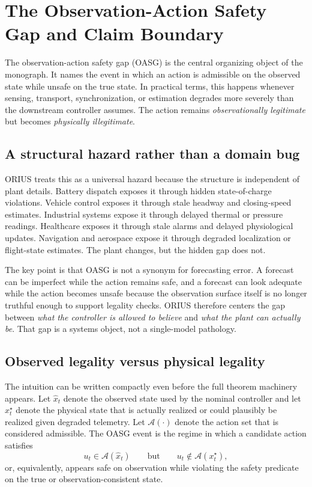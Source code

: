 \chapter{The Observation-Action Safety Gap and Claim Boundary}
\label{ch:oasg-claim-boundary}
\label{ch:safety-illusion}

The observation-action safety gap (OASG) is the central organizing object of the
monograph.  It names the event in which an action is admissible on the observed state
while unsafe on the true state.  In practical terms, this happens whenever sensing,
transport, synchronization, or estimation degrades more severely than the downstream
controller assumes.  The action remains \emph{observationally legitimate} but becomes
\emph{physically illegitimate}.

\section{A structural hazard rather than a domain bug}
ORIUS treats this as a universal hazard because the structure is independent of plant
details.  Battery dispatch exposes it through hidden state-of-charge violations.  Vehicle
control exposes it through stale headway and closing-speed estimates.  Industrial systems
expose it through delayed thermal or pressure readings.  Healthcare exposes it through
stale alarms and delayed physiological updates.  Navigation and aerospace expose it
through degraded localization or flight-state estimates.  The plant changes, but the
hidden gap does not.

The key point is that OASG is not a synonym for forecasting error.  A forecast can be
imperfect while the action remains safe, and a forecast can look adequate while the
action becomes unsafe because the observation surface itself is no longer truthful enough
to support legality checks.  ORIUS therefore centers the gap between \emph{what the
controller is allowed to believe} and \emph{what the plant can actually be}.  That gap
is a systems object, not a single-model pathology.

\section{Observed legality versus physical legality}
The intuition can be written compactly even before the full theorem machinery appears.
Let $\hat{x}_t$ denote the observed state used by the nominal controller and let
$x_t^\star$ denote the physical state that is actually realized or could plausibly be
realized given degraded telemetry.  Let $\mathcal{A}(\cdot)$ denote the action set that
is considered admissible.  The OASG event is the regime in which a candidate action
satisfies
\[
u_t \in \mathcal{A}(\hat{x}_t)
\qquad \text{but} \qquad
u_t \notin \mathcal{A}(x_t^\star),
\]
or, equivalently, appears safe on observation while violating the safety predicate on the
true or observation-consistent state.

